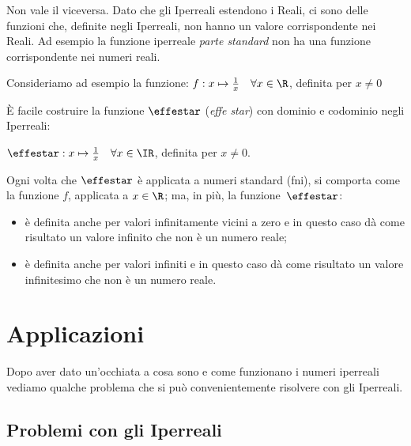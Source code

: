 \begin{osservazione}
 Non vale il viceversa. Dato che gli Iperreali estendono i Reali, ci sono 
delle funzioni che, definite negli Iperreali, non hanno un valore 
corrispondente nei Reali. Ad esempio la funzione iperreale \emph{parte 
standard} non ha una funzione corrispondente nei numeri reali.

\begin{esempio}
 Consideriamo ad esempio la funzione: 
\(f: x \mapsto \frac{1}{x} \quad \forall x \in \R\), definita per \(x\ne 0\)

È facile costruire la funzione \(\effestar\) (\emph{effe star}) con dominio e 
codominio negli Iperreali:

\(\effestar: x \mapsto \frac{1}{x} \quad \forall x \in \IR\), definita per 
\(x\ne 0\).

Ogni volta che \(\effestar\) è applicata a numeri standard (fni), si comporta 
come
la funzione \(f\), applicata a \(x \in \R\); ma, in più, la 
funzione~\(\effestar\):
\begin{itemize} [noitemsep]
 \item 
è definita anche per valori infinitamente vicini a zero e 
in questo caso dà come risultato un valore infinito che non è un numero 
reale;
 \item 
è definita anche per valori infiniti e
in questo caso dà come risultato un valore infinitesimo che non è un numero 
reale. 
\end{itemize}
\end{esempio}
\end{osservazione}

\section{Applicazioni}
\label{sec:insnum_applicazioni}

Dopo aver dato un'occhiata a cosa sono e come funzionano i numeri iperreali 
vediamo qualche problema che si può convenientemente risolvere con gli 
Iperreali.

\subsection{Problemi con gli Iperreali}
\label{subsec:insnum_problemi}

